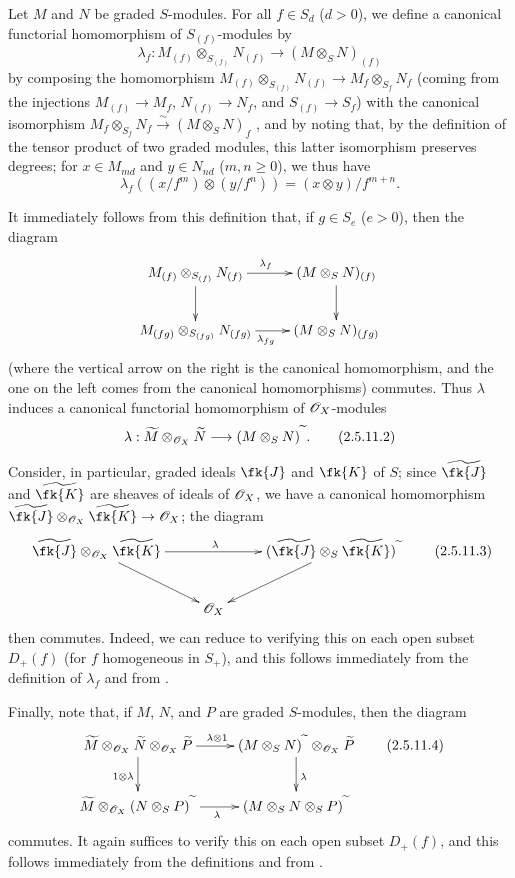 \begin{env}[2.5.11]
\label{II.2.5.11}
Let $M$ and $N$ be graded $S$-modules.
For all $f\in S_d$ ($d>0$), we define a canonical functorial homomorphism of $S_{(f)}$-modules by
\[
\label{II.2.5.11.1}
  \lambda_f: M_{(f)}\otimes_{S_{(f)}}N_{(f)} \to (M\otimes_S N)_{(f)}
\tag{2.5.11.1}
\]
by composing the homomorphism $M_{(f)}\otimes_{S_{(f)}}N_{(f)}\to M_f\otimes_{S_f}N_f$ (coming from the injections $M_{(f)}\to M_f$, $N_{(f)}\to N_f$, and $S_{(f)}\to S_f$) with the canonical isomorphism $M_f\otimes_{S_f}N_f\xrightarrow{\sim}(M\otimes_S N)_f$ , and by noting that, by the definition of the tensor product of two graded modules, this latter isomorphism preserves degrees;
for $x\in M_{md}$ and $y\in N_{nd}$ ($m,n\geq0$), we thus have
\[
  \lambda_f((x/f^m)\otimes(y/f^n)) = (x\otimes y)/f^{m+n}.
\]

It immediately follows from this definition that, if $g\in S_e$ ($e>0$), then the diagram
\[
  \xymatrix{
    M_{(f)}\otimes_{S_{(f)}}N_{(f)} \ar[r]^{\lambda_f} \ar[d]
    & (M\otimes_S N)_{(f)} \ar[d]
  \\M_{(fg)}\otimes_{S_{(fg)}}N_{(fg)} \ar[r]_{\lambda_{fg}}
    & (M\otimes_S N)_{(fg)}
  }
\]
(where the vertical arrow on the right is the canonical homomorphism, and the one on the left comes from the canonical homomorphisms) commutes.
Thus $\lambda$ induces a canonical functorial homomorphism of $\mathscr{O}_X$-modules
\[
\label{II.2.5.11.2}
  \lambda: \widetilde{M}\otimes_{\sh{O}_X}\widetilde{N} \to (M\otimes_S N)^\supertilde.
\tag{2.5.11.2}
\]

Consider, in particular, graded ideals $\fk{J}$ and $\fk{K}$ of $S$;
since $\widetilde{\fk{J}}$ and $\widetilde{\fk{K}}$ are sheaves of ideals of $\mathscr{O}_X$, we have a canonical homomorphism $\widetilde{\fk{J}}\otimes_{\sh{O}_X}\widetilde{\fk{K}}\to\sh{O}_X$;
the diagram
\[
\label{II.2.5.11.3}
  \xymatrix{
    \widetilde{\fk{J}}\otimes_{\sh{O}_X}\widetilde{\fk{K}} \ar[rr]^\lambda \ar[dr]
    && (\widetilde{\fk{J}}\otimes_S\widetilde{\fk{K}})^\supertilde \ar[dl]
  \\&\sh{O}_X&
  }
\tag{2.5.11.3}
\]
then commutes.
Indeed, we can reduce to verifying this on each open subset $D_+(f)$ (for $f$ homogeneous in $S_+$), and this follows immediately from the definition  of $\lambda_f$ and from .

Finally, note that, if $M$, $N$, and $P$ are graded $S$-modules, then the diagram
\[
\label{II.2.5.11.4}
  \xymatrix{
    \widetilde{M}\otimes_{\sh{O}_X}\widetilde{N}\otimes_{\sh{O}_X}\widetilde{P} \ar[r]^{\lambda\otimes1} \ar[d]_{1\otimes\lambda}
    & (M\otimes_S N)^\supertilde\otimes_{\sh{O}_X}\widetilde{P} \ar[d]^\lambda
  \\\widetilde{M}\otimes_{\sh{O}_X}(N\otimes_S P)^\supertilde \ar[r]_\lambda
    & (M\otimes_S N\otimes_S P)^\supertilde
  }
\tag{2.5.11.4}
\]
commutes.
It again suffices to verify this on each open subset $D_+(f)$, and this follows immediately from the definitions and from .
\end{env}

